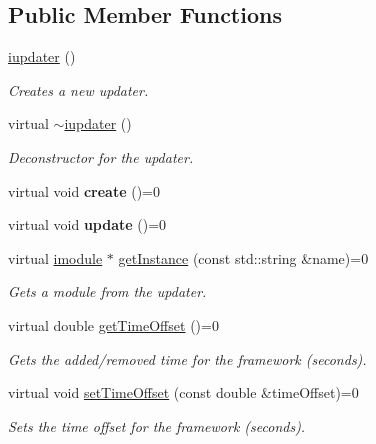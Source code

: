 \subsection*{Public Member Functions}
\begin{DoxyCompactItemize}
\item 
\hyperlink{classflounder_1_1iupdater_acbbc1766a8c236ba89ff55eee9b25850}{iupdater} ()
\begin{DoxyCompactList}\small\item\em Creates a new updater. \end{DoxyCompactList}\item 
virtual \hyperlink{classflounder_1_1iupdater_a70569371d9b898b7d30442a4463fbee4}{$\sim$iupdater} ()
\begin{DoxyCompactList}\small\item\em Deconstructor for the updater. \end{DoxyCompactList}\item 
\mbox{\label{classflounder_1_1iupdater_adf13e2f8614c4c404cf3b4beb44f2674}} 
virtual void {\bfseries create} ()=0
\item 
\mbox{\label{classflounder_1_1iupdater_a9f9102652e1ec25f7e9fc9b1cd57a041}} 
virtual void {\bfseries update} ()=0
\item 
virtual \hyperlink{classflounder_1_1imodule}{imodule} $\ast$ \hyperlink{classflounder_1_1iupdater_a391b1788b5c139b199ed48033da1b88d}{get\+Instance} (const std\+::string \&name)=0
\begin{DoxyCompactList}\small\item\em Gets a module from the updater. \end{DoxyCompactList}\item 
virtual double \hyperlink{classflounder_1_1iupdater_abd983cbbeed27f28e9be768a2d3b69f2}{get\+Time\+Offset} ()=0
\begin{DoxyCompactList}\small\item\em Gets the added/removed time for the framework (seconds). \end{DoxyCompactList}\item 
virtual void \hyperlink{classflounder_1_1iupdater_aa6aa143e40a5a39bcd53753798438ea1}{set\+Time\+Offset} (const double \&time\+Offset)=0
\begin{DoxyCompactList}\small\item\em Sets the time offset for the framework (seconds). \end{DoxyCompactList}\item 

\end{DoxyCompactItemize}
